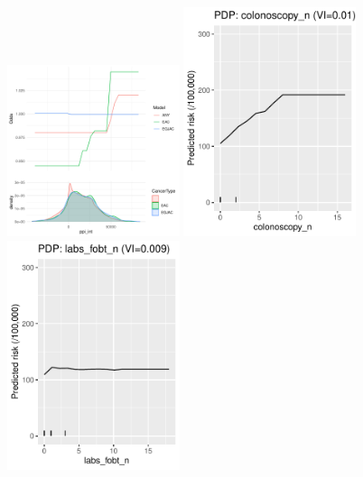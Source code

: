 \documentclass[12pt]{article}
\begin{document}
\clearpage
\begin{figure}[h]
\centering
\includegraphics[width=0.45\textwidth]{figures/pdp/ppi_int.pdf}
\includegraphics[width=0.45\textwidth]{figures/pdp/colonoscopy_n.pdf}
\includegraphics[width=0.45\textwidth]{figures/pdp/labs_fobt_n.pdf}
\end{figure}
\end{document}
